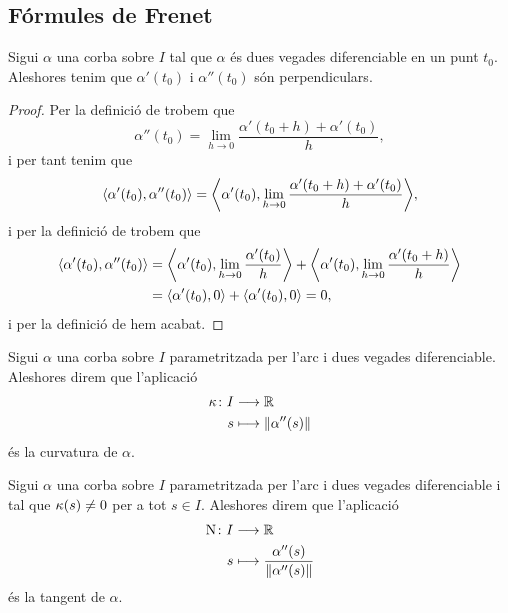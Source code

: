 \documentclass[../Apunts.tex]{subfiles}
\begin{document}
	\subsection{Fórmules de Frenet}
	\begin{proposition}
		\label{prop:la primera derivada i la segona derivada d'una corba són perpendiculars}
		Sigui \(\alpha\) una corba sobre \(I\) tal que \(\alpha\) és dues vegades diferenciable en un punt \(t_{0}\). Aleshores tenim que \(\alpha'(t_{0})\) i \(\alpha''(t_{0})\) són perpendiculars.
		\begin{proof}
			Per la definició de  trobem que
			\[\alpha''(t_{0})=\lim_{h\to0}\frac{\alpha'(t_{0}+h)+\alpha'(t_{0})}{h},\]
			i per tant tenim que
			\[\prodesc{\alpha'(t_{0})}{\alpha''(t_{0})}=\prodesc{\alpha'(t_{0})}{\lim_{h\to0}\frac{\alpha'(t_{0}+h)+\alpha'(t_{0})}{h}},\]
			i per la definició de  trobem que
			\begin{align*}
				\prodesc{\alpha'(t_{0})}{\alpha''(t_{0})}	&=\prodesc{\alpha'(t_{0})}{\lim_{h\to0}\frac{\alpha'(t_{0})}{h}}+\prodesc{\alpha'(t_{0})}{\lim_{h\to0}\frac{\alpha'(t_{0}+h)}{h}} \\
				&=\prodesc{\alpha'(t_{0})}{0}+\prodesc{\alpha'(t_{0})}{0}=0,
			\end{align*}
			i per la definició de  hem acabat.
		\end{proof}
	\end{proposition}
	\begin{definition}[Curvatura]
		\label{def:curvatura}
		Sigui \(\alpha\) una corba sobre \(I\) parametritzada per l'arc i dues vegades diferenciable. Aleshores direm que l'aplicació
		\begin{align*}
			\curvatura\colon I&\longrightarrow\mathbb{R} \\
			s&\longmapsto\norm{\alpha''(s)}
		\end{align*}
		és la curvatura de \(\alpha\).
	\end{definition}
	\begin{definition}
		\label{def:normal}
		Sigui \(\alpha\) una corba sobre \(I\) parametritzada per l'arc i dues vegades diferenciable i tal que \(\operatorname{\kappa}(s)\neq0\) per a tot \(s\in I\). Aleshores direm que l'aplicació
		\begin{align*}
			\normal\colon I&\longrightarrow\mathbb{R} \\
			s&\longmapsto\frac{\alpha''(s)}{\norm{\alpha''(s)}}
		\end{align*}
		és la tangent de \(\alpha\).
	\end{definition}
\end{document}
